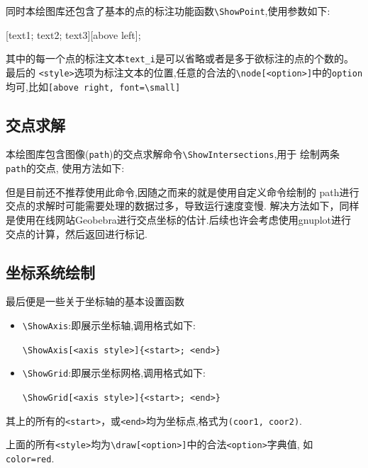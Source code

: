 \documentclass[12pt]{article}
\begin{document}
同时本绘图库还包含了基本的点的标注功能函数\verb|\ShowPoint|,使用参数如下:
\begin{codeprint}
    [text1; text2; text3][above left];
\end{codeprint}

其中的每一个点的标注文本\verb|text_i|是可以省略或者是多于欲标注的点的个数的。最后的 
\verb|<style>|选项为标注文本的位置,任意的合法的\verb|\node[<option>]|中的\verb|option|
均可,比如\verb|[above right, font=\small]|

\subsection{交点求解}
本绘图库包含图像(\texttt{path})的交点求解命令\verb|\ShowIntersections|,用于 
绘制两条 \texttt{path}的交点, 使用方法如下:
\begin{codeprint}
\end{codeprint}

但是目前还不推荐使用此命令,因随之而来的就是使用自定义命令绘制的
path进行交点的求解时可能需要处理的数据过多，导致运行速度变慢.
解决方法如下，同样是使用在线网站Geobebra进行交点坐标的估计.后续也许会考虑使用gnuplot进行
交点的计算，然后返回进行标记.


\subsection{坐标系统绘制}
最后便是一些关于坐标轴的基本设置函数
\begin{itemize}
    \item \verb|\ShowAxis|:即展示坐标轴,调用格式如下:\par
        \verb|\ShowAxis[<axis style>]{<start>; <end>}|
    \item \verb|\ShowGrid|:即展示坐标网格,调用格式如下:\par
        \verb|\ShowGrid[<axis style>]{<start>; <end>}|
\end{itemize}

其上的所有的\verb|<start>|，或\verb|<end>|均为坐标点,格式为\verb|(coor1, coor2)|.

上面的所有\verb|<style>|均为\verb|\draw[<option>]|中的合法\verb|<option>|字典值,
如 \verb|color=red|.
\end{document}
